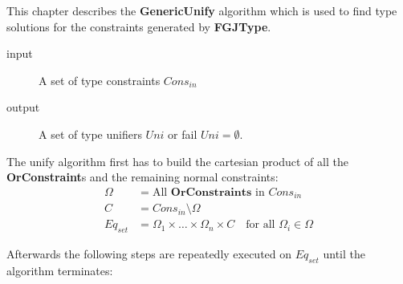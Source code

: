\label{sec:unify}
This chapter describes the \textbf{GenericUnify} algorithm
which is used to find type solutions for the constraints generated by \textbf{FGJType}.

\begin{description}
\item[input] A set of type constraints $Cons_{in}$ %
\item[output] A set of type unifiers $Uni$
or fail $Uni = \emptyset$.
\end{description}

The unify algorithm first has to build the cartesian product of all the \textbf{OrConstraint}s and the remaining normal constraints:
\begin{align*}
\Omega &= \text{All }\mathbf{OrConstraints} \text{ in } {Cons}_{in}\\
C &= {Cons}_{in} \setminus \Omega \\
Eq_{set} &= \Omega_1 \times \ldots \times \Omega_n \times C \quad \text{for all }\Omega_i \in \Omega
\end{align*}

Afterwards the following steps are repeatedly executed on $Eq_{set}$ until the algorithm terminates:

